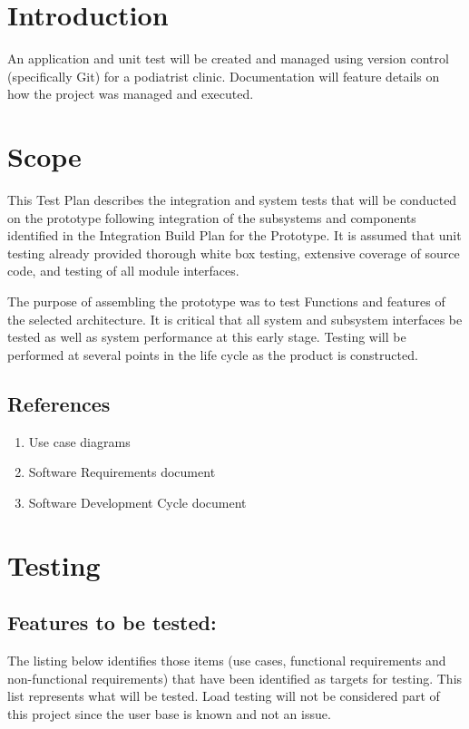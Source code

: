 \documentclass{unitemplate}
\begin{document}
	
\section{Introduction}
An application and unit test will be created and managed using version control (specifically Git) for a podiatrist clinic. Documentation will feature details on how the project was managed and executed.

\section{Scope}
This Test Plan describes the integration and system tests that will be conducted on the prototype following integration of the subsystems and components identified in the Integration Build Plan for the Prototype. It is assumed that unit testing already provided thorough white box testing, extensive coverage of source code, and testing of all module interfaces.

The purpose of assembling the prototype was to test Functions and features of the selected architecture. It is critical that all system and subsystem interfaces be tested as well as system performance at this early stage. Testing will be performed at several points in the life cycle as the product is constructed. 

\subsection{References}
    \begin{enumerate}
    \item Use case diagrams
    \item Software Requirements document
    \item Software Development Cycle document 
\end{enumerate}

\section{Testing}
\subsection{Features to be tested: }
The listing below identifies those items (use cases, functional requirements and non-functional requirements) that have been identified as targets for testing. This list represents what will be tested.
Load testing will not be considered part of this project since the user base is known and not an issue.
\end{document}
